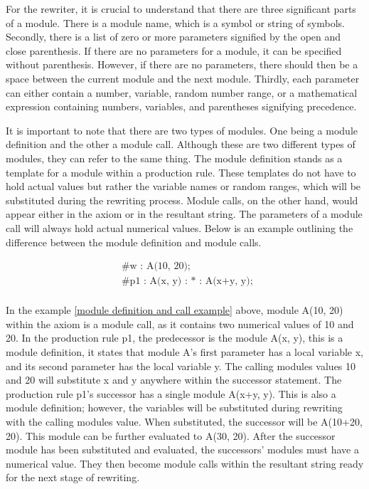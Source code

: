 For the rewriter, it is crucial to understand that there are three significant parts of a module. There is a module name, which is a symbol or string of symbols. Secondly, there is a list of zero or more parameters signified by the open and close parenthesis. If there are no parameters for a module, it can be specified without parenthesis. However, if there are no parameters, there should then be a space between the current module and the next module. Thirdly, each parameter can either contain a number, variable, random number range, or a mathematical expression containing numbers, variables, and parentheses signifying precedence. 

It is important to note that there are two types of modules. One being a module definition and the other a module call. Although these are two different types of modules, they can refer to the same thing. The module definition stands as a template for a module within a production rule. These templates do not have to hold actual values but rather the variable names or random ranges, which will be substituted during the rewriting process. Module calls, on the other hand, would appear either in the axiom or in the resultant string. The parameters of a module call will always hold actual numerical values. Below is an example outlining the difference between the module definition and module calls.

\begin{equation} \label{module definition and call example}
\begin{aligned}
	&\text{\#w : A(10, 20);}\\
	&\text{\#p1 : A(x, y) : * : A(x+y, y); }\\
\end{aligned}
\end{equation}

\noindent
In the example \ref{module definition and call example} above, module A(10, 20) within the axiom is a module call, as it contains two numerical values of 10 and 20. In the production rule p1, the predecessor is the module A(x, y), this is a module definition, it states that module A's first parameter has a local variable x, and its second parameter has the local variable y. The calling modules values 10 and 20 will substitute x and y anywhere within the successor statement. The production rule p1's successor has a single module A(x+y, y). This is also a module definition; however, the variables will be substituted during rewriting with the calling modules value. When substituted, the successor will be A(10+20, 20). This module can be further evaluated to A(30, 20). After the successor module has been substituted and evaluated, the successors' modules must have a numerical value. They then become module calls within the resultant string ready for the next stage of rewriting.

